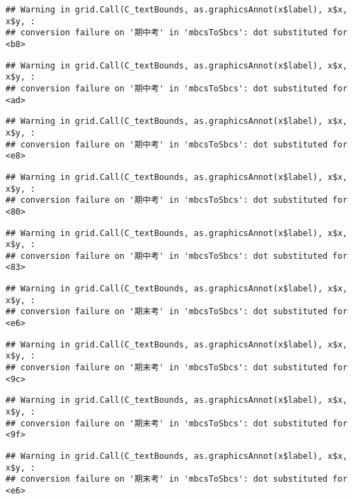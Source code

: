 \documentclass[
]{book}
\begin{document}
\begin{verbatim}
## Warning in grid.Call(C_textBounds, as.graphicsAnnot(x$label), x$x, x$y, :
## conversion failure on '期中考' in 'mbcsToSbcs': dot substituted for <b8>
\end{verbatim}

\begin{verbatim}
## Warning in grid.Call(C_textBounds, as.graphicsAnnot(x$label), x$x, x$y, :
## conversion failure on '期中考' in 'mbcsToSbcs': dot substituted for <ad>
\end{verbatim}

\begin{verbatim}
## Warning in grid.Call(C_textBounds, as.graphicsAnnot(x$label), x$x, x$y, :
## conversion failure on '期中考' in 'mbcsToSbcs': dot substituted for <e8>
\end{verbatim}

\begin{verbatim}
## Warning in grid.Call(C_textBounds, as.graphicsAnnot(x$label), x$x, x$y, :
## conversion failure on '期中考' in 'mbcsToSbcs': dot substituted for <80>
\end{verbatim}

\begin{verbatim}
## Warning in grid.Call(C_textBounds, as.graphicsAnnot(x$label), x$x, x$y, :
## conversion failure on '期中考' in 'mbcsToSbcs': dot substituted for <83>
\end{verbatim}

\begin{verbatim}
## Warning in grid.Call(C_textBounds, as.graphicsAnnot(x$label), x$x, x$y, :
## conversion failure on '期末考' in 'mbcsToSbcs': dot substituted for <e6>
\end{verbatim}

\begin{verbatim}
## Warning in grid.Call(C_textBounds, as.graphicsAnnot(x$label), x$x, x$y, :
## conversion failure on '期末考' in 'mbcsToSbcs': dot substituted for <9c>
\end{verbatim}

\begin{verbatim}
## Warning in grid.Call(C_textBounds, as.graphicsAnnot(x$label), x$x, x$y, :
## conversion failure on '期末考' in 'mbcsToSbcs': dot substituted for <9f>
\end{verbatim}

\begin{verbatim}
## Warning in grid.Call(C_textBounds, as.graphicsAnnot(x$label), x$x, x$y, :
## conversion failure on '期末考' in 'mbcsToSbcs': dot substituted for <e6>
\end{verbatim}
\end{document}
